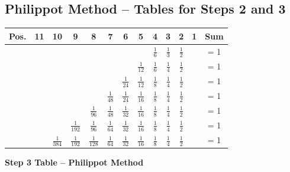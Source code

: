 \documentclass[a4paper,11pt]{article}
\begin{document}
\subsection{Philippot Method -- Tables for Steps 2 and 3}
\begin{center}
\scriptsize
\begin{tabular}{|c|c|c|c|c|c|c|c|c|c|c|c|c|}
\hline
\textbf{Pos.} & 11 & 10 & 9 & 8 & 7 & 6 & 5 & 4 & 3 & 2 & 1 & \textbf{Sum} \\
\hline
& & & & & & & & \(\frac{1}{6}\) & \(\frac{1}{3}\) & \(\frac{1}{2}\) & & = 1 \\
\hline
& & & & & & & \(\frac{1}{12}\) & \(\frac{1}{6}\) & \(\frac{1}{4}\) & \(\frac{1}{2}\) & & = 1 \\
\hline
& & & & & & \(\frac{1}{24}\) & \(\frac{1}{12}\) & \(\frac{1}{8}\) & \(\frac{1}{4}\) & \(\frac{1}{2}\) & & = 1 \\
\hline
& & & & & \(\frac{1}{48}\) & \(\frac{1}{24}\) & \(\frac{1}{16}\) & \(\frac{1}{8}\) & \(\frac{1}{4}\) & \(\frac{1}{2}\) & & = 1 \\
\hline
& & & & \(\frac{1}{96}\) & \(\frac{1}{48}\) & \(\frac{1}{32}\) & \(\frac{1}{16}\) & \(\frac{1}{8}\) & \(\frac{1}{4}\) & \(\frac{1}{2}\) & & = 1 \\
\hline
& & & \(\frac{1}{192}\) & \(\frac{1}{96}\) & \(\frac{1}{64}\) & \(\frac{1}{32}\) & \(\frac{1}{16}\) & \(\frac{1}{8}\) & \(\frac{1}{4}\) & \(\frac{1}{2}\) & & = 1 \\
\hline
& & \(\frac{1}{384}\) & \(\frac{1}{192}\) & \(\frac{1}{128}\) & \(\frac{1}{64}\) & \(\frac{1}{32}\) & \(\frac{1}{16}\) & \(\frac{1}{8}\) & \(\frac{1}{4}\) & \(\frac{1}{2}\) & & = 1 \\
\hline
\end{tabular}
\end{center}

\vspace{0.5cm}

\begin{center}
\textbf{Step 3 Table -- Philippot Method}
\end{center}
\end{document}
